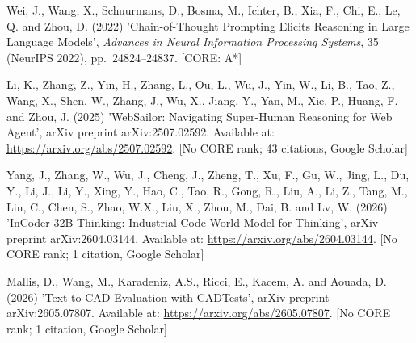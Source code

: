 \documentclass[10pt]{article}
\begin{document}
\begin{list}{}{\setlength{\leftmargin}{2em}\setlength{\itemindent}{-2em}}
\item Wei, J., Wang, X., Schuurmans, D., Bosma, M., Ichter, B., Xia, F., Chi, E., Le, Q. and Zhou, D. (2022) 'Chain-of-Thought Prompting Elicits Reasoning in Large Language Models', \textit{Advances in Neural Information Processing Systems}, 35 (NeurIPS 2022), pp.\ 24824--24837. [CORE: A*]
\item Li, K., Zhang, Z., Yin, H., Zhang, L., Ou, L., Wu, J., Yin, W., Li, B., Tao, Z., Wang, X., Shen, W., Zhang, J., Wu, X., Jiang, Y., Yan, M., Xie, P., Huang, F. and Zhou, J. (2025) 'WebSailor: Navigating Super-Human Reasoning for Web Agent', arXiv preprint arXiv:2507.02592. Available at: \url{https://arxiv.org/abs/2507.02592}. [No CORE rank; 43 citations, Google Scholar]
\item Yang, J., Zhang, W., Wu, J., Cheng, J., Zheng, T., Xu, F., Gu, W., Jing, L., Du, Y., Li, J., Li, Y., Xing, Y., Hao, C., Tao, R., Gong, R., Liu, A., Li, Z., Tang, M., Lin, C., Chen, S., Zhao, W.X., Liu, X., Zhou, M., Dai, B. and Lv, W. (2026) 'InCoder-32B-Thinking: Industrial Code World Model for Thinking', arXiv preprint arXiv:2604.03144. Available at: \url{https://arxiv.org/abs/2604.03144}. [No CORE rank; 1 citation, Google Scholar] %
\item Mallis, D., Wang, M., Karadeniz, A.S., Ricci, E., Kacem, A. and Aouada, D. (2026) 'Text-to-CAD Evaluation with CADTests', arXiv preprint arXiv:2605.07807. Available at: \url{https://arxiv.org/abs/2605.07807}. [No CORE rank; 1 citation, Google Scholar]
\end{list}
\end{document}
